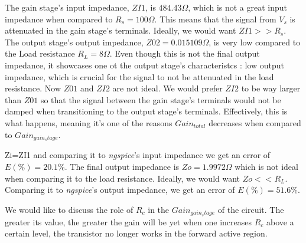The gain stage's input impedance, $ZI1$, is $484.43\Omega$, which is not a great input impedance when compared to $R_s=100\Omega$. This means that the signal from $V_s$ is
attenuated in the gain stage's terminals. Ideally, we would want $ZI1>>R_s$. The output stage's output impedance, $Z02=0.015109 \Omega$, is very low compared to the Load resistance $R_L=8\Omega$.
Even though this is not the final output impedance, it showcases one ot the output stage's characteristcs : low output impedance, which is crucial for the signal to not be attenuated in the load resistance.
Now $Z01$ and $ZI2$ are not ideal. We would prefer $ZI2$ to be way larger than $Z01$ so that the signal between the gain stage's terminals would not be damped when transitioning to the output stage's terminals.
Effectively, this is what happens, meaning it's one of the reasons $Gain_{total}$ decreases when compared to $Gain_{gain_stage}$.\par
Zi=ZI1 and comparing it to \textit{ngspice}'s input impedance we get an error of $E(\%)=20.1\%$. The final output impedance is $Zo=1.9972\Omega$ which is not ideal when comparing it to the load resistance. Ideally,
we would want $Zo<<R_L$. Comparing it to \textit{ngspice}'s output impedance, we get an error of $E(\%)=51.6\%$.
\par
We would like to discuss the role of $R_c$ in the $Gain_{gain_stage}$ of the circuit. The greater its value, the greater the gain will be yet when one increases $R_c$ above a certain level, the transistor no longer works in
the forward active region.
